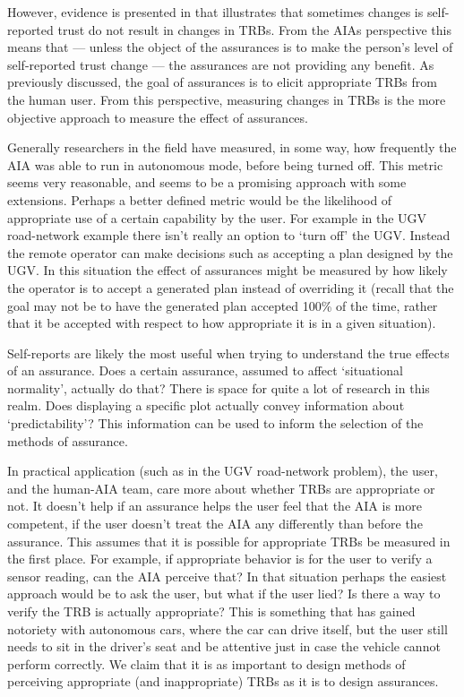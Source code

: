     However, evidence is presented in \cite{Dzindolet2003-ts} that illustrates that sometimes changes is self-reported trust do not result in changes in TRBs. From the AIAs perspective this means that --- unless the object of the assurances is to make the person's level of self-reported trust change --- the assurances are not providing any benefit. As previously discussed, the goal of assurances is to elicit appropriate TRBs from the human user. From this perspective, measuring changes in TRBs is the more objective approach to measure the effect of assurances.

    Generally researchers in the field have measured, in some way, how frequently the AIA was able to run in autonomous mode, before being turned off. This metric seems very reasonable, and seems to be a promising approach with some extensions. Perhaps a better defined metric would be the likelihood of appropriate use of a certain capability by the user. For example in the UGV road-network example there isn't really an option to `turn off' the UGV. Instead the remote operator can make decisions such as accepting a plan designed by the UGV. In this situation the effect of assurances might be measured by how likely the operator is to accept a generated plan instead of overriding it (recall that the goal may not be to have the generated plan accepted 100\% of the time, rather that it be accepted with respect to how appropriate it is in a given situation).

    Self-reports are likely the most useful when trying to understand the true effects of an assurance. Does a certain assurance, assumed to affect `situational normality', actually do that? There is space for quite a lot of research in this realm. Does displaying a specific plot actually convey  information about `predictability'? This information can be used to inform the selection of the methods of assurance.

    In practical application (such as in the UGV road-network problem), the user, and the human-AIA team, care more about whether TRBs are appropriate or not. It doesn't help if an assurance helps the user feel that the AIA is more competent, if the user doesn't treat the AIA any differently than before the assurance. This assumes that it is possible for appropriate TRBs be measured in the first place. For example, if appropriate behavior is for the user to verify a sensor reading, can the AIA perceive that? In that situation perhaps the easiest approach would be to ask the user, but what if the user lied? Is there a way to verify the TRB is actually appropriate? This is something that has gained notoriety with autonomous cars, where the car can drive itself, but the user still needs to sit in the driver's seat and be attentive just in case the vehicle cannot perform correctly. We claim that it is as important to design methods of perceiving appropriate (and inappropriate) TRBs as it is to design assurances. 


